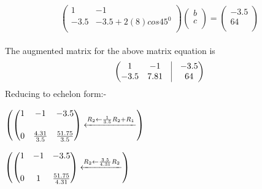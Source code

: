 \documentclass{article}
\newcommand{\myvec}[1]{\ensuremath{\begin{pmatrix}#1\end{pmatrix}}}
\begin{document}
        \vspace{5mm}           
   \\  
   \begin{equation}
    \begin{pmatrix}
	    1 & -1 \\
           -3.5 & -3.5+2(8)cos45^0 \\
            
        \end{pmatrix}
        \begin{pmatrix}
            b \\
            c \\
        \end{pmatrix}
           =
           \begin{pmatrix}
           -3.5\\
            64\\
        \end{pmatrix}
	\end{equation}
        \vspace{5mm}           
   \\  
   The augmented matrix for the above matrix equation is 
\vspace{3mm}
\begin{equation}
\begin{pmatrix}
   1 & -1 & \vrule & -3.5 \\
  -3.5 & 7.81 & \vrule & 64
    \end{pmatrix}  
    \end{equation}
   \vspace{5mm}
    Reducing to echelon form:-
   \\
   \begin{center}
    $\begin{pmatrix}
	    \myvec{ 1 &-1  & -3.5 \vspace{5mm} \\ 0 & \frac{4.31}{3.5} & \frac{51.75}{3.5}}
	    \xleftarrow{R_2 \leftarrow \frac{1}{3.5}R_2+R_1}
    \end{pmatrix}$
	   \\
   \end{center}
  \vspace{5mm}
  \begin{center}
   $\begin{pmatrix}
	   \myvec{1 &-1  & -3.5 \vspace{5mm} \\ 0 & 1 & \frac{51.75}{4.31}}
	   \xleftarrow{R_2 \leftarrow \frac{3.5}{4.31}R_2}
    \end{pmatrix}$
  \\
	  \end{center}
\end{document}
